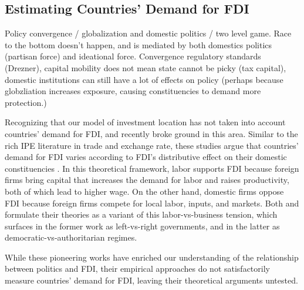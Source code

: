 \subsection{Estimating Countries' Demand for FDI}

Policy convergence / globalization and domestic politics / two level game. Race
to the bottom doesn't happen, and is mediated by both domestics politics
(partisan force) and ideational force. Convergence regulatory standards
(Drezner), capital mobility does not mean state cannot be picky (tax capital),
domestic institutions can still have a lot of effects on policy (perhaps because
globzliation increases exposure, causing constituencies to demand more protection.)

Recognizing that our model of investment location has not taken into account
countries' demand for FDI, \citet{Pinto2013} and \citet{Pandya2016} recently
broke ground in this area. Similar to the rich IPE literature in trade and
exchange rate, these studies argue that countries' demand for FDI varies
according to FDI's distributive effect on their domestic constituencies
\citep{Broz2001, Milner2005a}. In this theoretical framework, labor supports FDI
because foreign firms bring capital that increases the demand for labor and
raises productivity, both of which lead to higher wage. On the other hand,
domestic firms oppose FDI because foreign firms compete for local labor, inputs,
and markets. Both \citet{Pinto2013} and \citet{Pandya2016} formulate their
theories as a variant of this labor-vs-business tension, which surfaces in the
former work as left-vs-right governments, and in the latter as
democratic-vs-authoritarian regimes.

While these pioneering works have enriched our understanding of the relationship
between politics and FDI, their empirical approaches do not satisfactorily
measure countries' demand for FDI, leaving their theoretical arguments untested.

